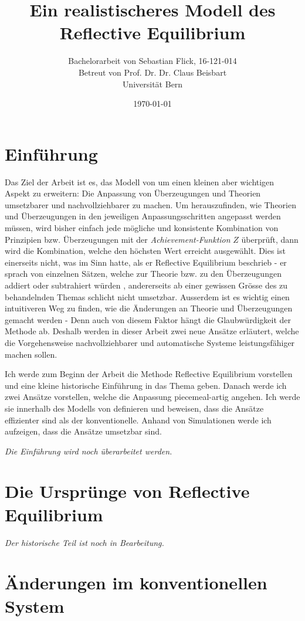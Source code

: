 \documentclass{article}
\title{Ein realistischeres Modell des Reflective Equilibrium}
\author{Bachelorarbeit von Sebastian Flick, 16-121-014\\Betreut von Prof. Dr. Dr. Claus Beisbart\\Universität Bern}
\date{\today}
\begin{document}
\maketitle
\section{Einführung}
Das Ziel der Arbeit ist es, das Modell von \autocite{beisbart_making_2015} um einen kleinen aber wichtigen Aspekt zu erweitern: Die Anpassung von Überzeugungen und Theorien umsetzbarer und nachvollziehbarer zu machen. Um herauszufinden, wie Theorien und Überzeugungen in den jeweiligen Anpassungsschritten angepasst werden müssen, wird bisher einfach jede mögliche und konsistente Kombination von Prinzipien bzw. Überzeugungen mit der \textit{Achievement-Funktion} $Z$ überprüft, dann wird die Kombination, welche den höchsten Wert erreicht ausgewählt. Dies ist einerseits nicht, was \citeauthor{goodman_fact_1983} im Sinn hatte, als er Reflective Equilibrium beschrieb - er sprach von einzelnen Sätzen, welche zur Theorie bzw. zu den Überzeugungen addiert oder subtrahiert würden \autocite{goodman_fact_1983}, andererseits ab einer gewissen Grösse des zu behandelnden Themas schlicht nicht umsetzbar. Ausserdem ist es wichtig einen intuitiveren Weg zu finden, wie die Änderungen an Theorie und Überzeugungen gemacht werden - Denn auch von diesem Faktor hängt die Glaubwürdigkeit der Methode ab. Deshalb werden in dieser Arbeit zwei neue Ansätze erläutert, welche die Vorgehensweise nachvollziehbarer und automatische Systeme leistungsfähiger machen sollen.

Ich werde zum Beginn der Arbeit die Methode Reflective Equilibrium vorstellen und eine kleine historische Einführung in das Thema geben. Danach werde ich zwei Ansätze vorstellen, welche die Anpassung piecemeal-artig angehen. Ich werde sie innerhalb des Modells von \citeauthor{beisbart_making_2015} definieren und beweisen, dass die Ansätze effizienter sind als der konventionelle. Anhand von Simulationen werde ich aufzeigen, dass die Ansätze umsetzbar sind.

\textit{Die Einführung wird noch überarbeitet werden.}
\section{Die Ursprünge von Reflective Equilibrium}

\textit{Der historische Teil ist noch in Bearbeitung.}

\section{Änderungen im konventionellen System}
\end{document}
